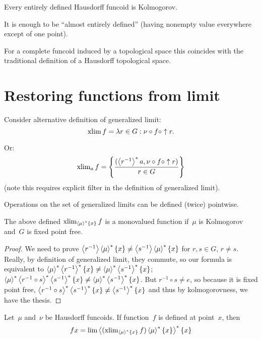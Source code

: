 \begin{cor}
Every entirely defined Hausdorff funcoid is Kolmogorov.
\end{cor}

\begin{rem}
It is enough to be ``almost entirely defined'' (having nonempty
value everywhere except of one point).
\end{rem}

\begin{obvious}
For a complete funcoid induced by a topological space this
coincides with the traditional definition of a Hausdorff
topological space.
\end{obvious}

\section{Restoring functions from limit}

Consider alternative definition of generalized limit:
\[ \operatorname{xlim} f = \lambda r\in G: \nu\circ f\circ\uparrow r. \]

Or:
\[ \operatorname{xlim}_a f = \left\{ \frac{(\left\langle r^{-1}\right\rangle ^{\ast}a, \nu\circ f\circ\uparrow r)}{r\in G}\right\} \]
(note this requires explicit filter in the definition of generalized limit).

Operations on the set of generalized limits can be defined (twice) pointwise. 

\begin{prop}
The above defined $\operatorname{xlim}_{\left\langle \mu\right\rangle ^{\ast}\{x\}} f$ is a monovalued
function if~$\mu$ is Kolmogorov and~$G$ is fixed point free.
\end{prop}

\begin{proof}
We need to prove $\left\langle r^{-1}\right\rangle\left\langle \mu\right\rangle ^{\ast}\{x\}\ne
\left\langle s^{-1}\right\rangle\left\langle \mu\right\rangle ^{\ast}\{x\}$ for $r,s\in G$, $r\ne s$.
Really, by definition of generalized limit, they commute, so our
formula is equivalent to
$\left\langle \mu\right\rangle ^{\ast}\left\langle r^{-1}\right\rangle ^{\ast}\{x\}\ne
\left\langle \mu\right\rangle ^{\ast}\left\langle s^{-1}\right\rangle ^{\ast}\{x\}$;
$\left\langle \mu\right\rangle ^{\ast}\left\langle r^{-1}\circ s\right\rangle ^{\ast}\left\langle s^{-1}\right\rangle ^{\ast}\{x\}\ne
\left\langle \mu\right\rangle ^{\ast}\left\langle s^{-1}\right\rangle ^{\ast}\{x\}$.
But $r^{-1}\circ s\ne e$, so because it is fixed point free,
$\left\langle r^{-1}\circ s\right\rangle ^{\ast}\left\langle s^{-1}\right\rangle ^{\ast}\{x\}\ne
\left\langle s^{-1}\right\rangle ^{\ast}\{x\}$ and thus by kolmogorovness, we have the
thesis.
\end{proof}

\begin{lem}
Let~$\mu$ and~$\nu$ be Hausdorff funcoids. If function~$f$ is defined at point~$x$, then
\[ fx=
\lim\left\langle (\operatorname{xlim}_{\left\langle \mu\right\rangle ^{\ast}\{x\}}f)\left\langle \mu\right\rangle ^{\ast}\{x\}\right\rangle ^{\ast}\{x\}
\]
\end{lem}

